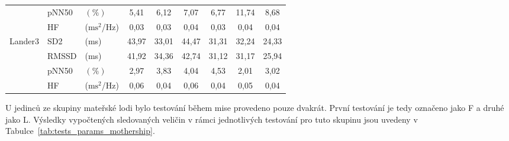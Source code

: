 \begin{table}[h]
\begin{threeparttable}
\begin{tabular*}{\linewidth}{@{\extracolsep{\fill}} lllcccccc @{}}
            & pNN50                                 & $(\%)$                         & 5,41                           & 6,12                            & 7,07            & 6,77        & 11,74           & 8,68        \\
            & HF                                    & ($\text{ms}^2$/Hz)             & 0,03                           & 0,03                           & 0,04            & 0,03        & 0,04            & 0,04        \\ \midrule
            \multirow[t]{4}{*}{Lander3} & SD2                                  & (ms)                           & 43,97                          & 33,01                          & 44,47           & 31,31        & 32,24           & 24,33       \\
            & RMSSD                                 & (ms)                           & 41,92                          & 34,36                          & 42,74           & 31,12        & 31,17           & 25,94       \\
            & pNN50                                 & $(\%)$                         & 2,97                           & 3,83                           & 4,04            & 4,53         & 2,01            & 3,02        \\
            & HF                                    & ($\text{ms}^2$/Hz)             & 0,06                           & 0,04                           & 0,06            & 0,04        & 0,05            & 0,04        \\
            \bottomrule
        \end{tabular*}
    \end{threeparttable}
    \label{tab:tests_params_lander}
\end{table}

U jedinců ze skupiny mateřské lodi bylo testování během mise provedeno pouze
dvakrát. První testování je tedy označeno jako F a druhé jako L. Výsledky
vypočtených sledovaných veličin v rámci jednotlivých testování pro tuto skupinu
jsou uvedeny v Tabulce~\ref{tab:tests_params_mothership}.

